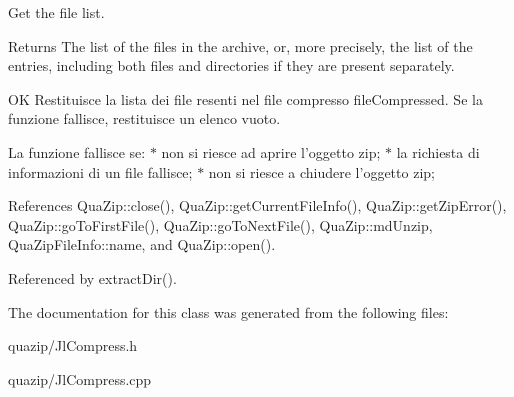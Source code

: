 Get the file list. 

\begin{DoxyReturn}{Returns}
The list of the files in the archive, or, more precisely, the list of the entries, including both files and directories if they are present separately.
\end{DoxyReturn}
OK Restituisce la lista dei file resenti nel file compresso fileCompressed. Se la funzione fallisce, restituisce un elenco vuoto.

La funzione fallisce se: $\ast$ non si riesce ad aprire l'oggetto zip; $\ast$ la richiesta di informazioni di un file fallisce; $\ast$ non si riesce a chiudere l'oggetto zip; 

References QuaZip::close(), QuaZip::getCurrentFileInfo(), QuaZip::getZipError(), QuaZip::goToFirstFile(), QuaZip::goToNextFile(), QuaZip::mdUnzip, QuaZipFileInfo::name, and QuaZip::open().



Referenced by extractDir().



The documentation for this class was generated from the following files:\begin{DoxyCompactItemize}
\item 
quazip/JlCompress.h\item 
quazip/JlCompress.cpp\end{DoxyCompactItemize}
